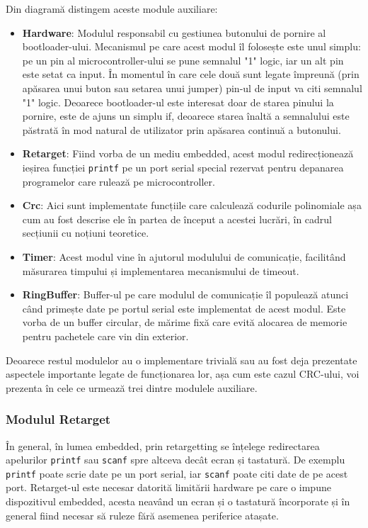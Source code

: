 \documentclass[12pt,a4paper,titlepage]{report}
\begin{document}
Din diagramă distingem aceste module auxiliare:
\begin{itemize}
\item \textbf{Hardware}: Modulul responsabil cu gestiunea butonului de pornire al bootloader-ului. Mecanismul pe care acest modul îl folosește este unul simplu: pe un pin al microcontroller-ului se pune semnalul "1" logic, iar un alt pin este setat ca input. În momentul în care cele două sunt legate împreună (prin apăsarea unui buton sau setarea unui jumper) pin-ul de input va citi semnalul "1" logic. Deoarece bootloader-ul este interesat doar de starea pinului la pornire, este de ajuns un simplu if, deoarece starea înaltă a semnalului este păstrată în mod natural de utilizator prin apăsarea continuă a butonului.
\item \textbf{Retarget}: Fiind vorba de un mediu embedded, acest modul redirecționează ieșirea funcției \texttt{printf} pe un port serial special rezervat pentru depanarea programelor care rulează pe microcontroller.
\item \textbf{Crc}: Aici sunt implementate funcțiile care calculează codurile polinomiale așa cum au fost descrise ele în partea de început a acestei lucrări, în cadrul secțiunii cu noțiuni teoretice.
\item \textbf{Timer}: Acest modul vine în ajutorul modulului de comunicație, facilitând măsurarea timpului și implementarea mecanismului de timeout.
\item \textbf{RingBuffer}: Buffer-ul pe care modulul de comunicație îl populează atunci când primește date pe portul serial este implementat de acest modul. Este vorba de un buffer circular, de mărime fixă care evită alocarea de memorie pentru pachetele care vin din exterior.
\end{itemize}

Deoarece restul modulelor au o implementare trivială sau au fost deja prezentate aspectele importante legate de funcționarea lor, așa cum este cazul CRC-ului, voi prezenta în cele ce urmează trei dintre modulele auxiliare.

\subsubsection{Modulul Retarget}
În general, în lumea embedded, prin retargetting se înțelege redirectarea apelurilor \texttt{printf} sau \texttt{scanf} spre altceva decât ecran și tastatură. De exemplu \texttt{printf} poate scrie date pe un port serial, iar \texttt{scanf} poate citi date de pe acest port. Retarget-ul este necesar datorită limitării hardware pe care o impune dispozitivul embedded, acesta neavând un ecran și o tastatură încorporate și în general fiind necesar să ruleze fără asemenea periferice atașate.
\end{document}
